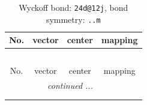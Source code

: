 \documentclass[fleqn,8pt]{jsarticle}
\begin{document}
\renewcommand{\arraystretch}{1.2}
\begin{longtable}{cccc}
\caption{Wyckoff bond: {\tt 24d@12j}, bond symmetry: {\tt ..m}}
 \\
 \hline \hline
No. & vector & center & mapping \\ \hline \endfirsthead

\multicolumn{3}{l}{\tablename\ \thetable{}} \\
 \hline \hline
No. & vector & center & mapping \\ \hline \endhead

 \hline \hline
\multicolumn{3}{r}{\footnotesize\it continued ...} \\ \endfoot

 \hline \hline
\multicolumn{3}{r}{} \\ \endlastfoot


\end{longtable}
\end{document}
